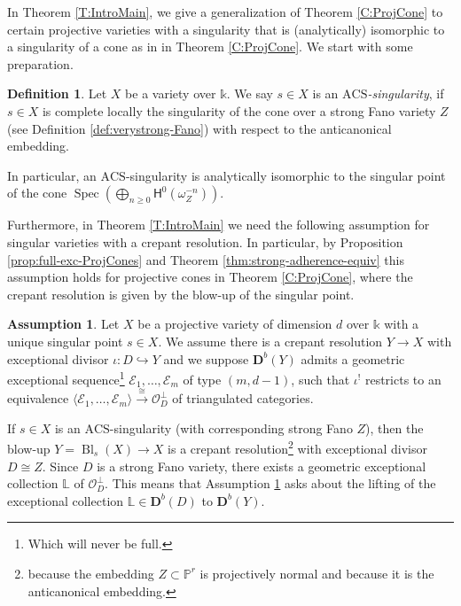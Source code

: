 \documentclass[a4paper,11pt, reqno]{amsart}
\def\P{\mathbb P}
\def\DD{\mathbf D}
\def\OO{\mathcal O}
\def\sE{\mathscr{E}}
\def\Spec{{\operatorname{Spec}}}
\def\Spec{{\operatorname{Spec}}}
\def\Bl{{\operatorname{Bl}}}
\def\Db{\DD^b}
\newcommand{\bH}{\mathsf{H}}
\theoremstyle{plain}
\theoremstyle{definition}
\newtheorem{definition}[dummy]{Definition}
\numberwithin{equation}{section}
\newlength{\arrow}
\newtheorem{assumption}[dummy]{Assumption}
\begin{document}
In Theorem \ref{T:IntroMain}, we give a generalization of Theorem \ref{C:ProjCone} to certain projective varieties with a singularity that is (analytically) isomorphic to a singularity of a cone as in in Theorem \ref{C:ProjCone}.
We start with some preparation.

\begin{definition}\label{def:ACS}
Let $X$ be a variety over $\mathbb{k}$.
    We say $s \in X$ is an \emph{$\mathrm{ACS}$-singularity}, if $s\in X$ is complete locally the singularity of the cone 
        over a strong Fano variety 
        $Z$ (see Definition \ref{def:verystrong-Fano})
        with respect to the anticanonical embedding. 
\end{definition}

In particular,
        an $\mathrm{ACS}$-singularity is analytically isomorphic to the singular point of the cone $\Spec \left(\bigoplus_{n\geq 0} \bH^0(\omega_Z^{-n})\right)$.

        Furthermore, in Theorem \ref{T:IntroMain} we need the following assumption for  singular varieties with a crepant resolution.
        In particular, by Proposition \ref{prop:full-exc-ProjCones} and Theorem \ref{thm:strong-adherence-equiv} this assumption holds for projective cones in Theorem \ref{C:ProjCone}, where the crepant resolution is given by the blow-up of the singular point.


\begin{assumption}\label{A:KeyAssumptions}
    Let $X$ be a projective variety  of dimension $d$ over $\mathbb{k}$ 
    with a unique singular point $s \in X$. 
    We assume there is a  crepant resolution $Y \to X$ with exceptional divisor $\iota \colon D \hookrightarrow Y$ and we suppose $\Db(Y)$ admits a geometric exceptional sequence\footnote{Which will never be full.} $\sE_1, \ldots, \sE_m$ of type 
        $(m, d-1)$, such that $\iota^!$ 
restricts to an equivalence 
$\langle \sE_1, \ldots, \sE_m \rangle \xrightarrow{\cong} \mathcal{O}_D^\perp$ of triangulated categories.
\end{assumption}

If $s\in X$ is an $\mathrm{ACS}$-singularity (with corresponding strong Fano $Z$), then the blow-up $Y = \Bl_s (X) \to X$ is a crepant resolution\footnote{because the embedding $Z \subset \P^r$ is projectively normal and because it is the anticanonical embedding.} with exceptional divisor $D\cong Z$.
Since $D $ is a strong Fano variety, there exists a geometric exceptional collection $\mathbb{L}$ of $\OO_D^\perp$.
This means that Assumption \ref{A:KeyAssumptions} asks about the lifting of the exceptional collection $\mathbb{L} \in \Db(D)$ to $\Db( Y )$.
\end{document}
